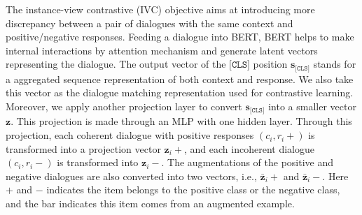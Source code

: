 \documentclass[letterpaper]{article} \usepackage{aaai22}  \usepackage{times}  \usepackage{helvet}  \usepackage{courier}  \usepackage[hyphens]{url}  \usepackage{graphicx} \urlstyle{rm} \def\UrlFont{\rm}  \usepackage{natbib}  \usepackage{caption} \DeclareCaptionStyle{ruled}{labelfont=normalfont,labelsep=colon,strut=off} \frenchspacing  \setlength{\pdfpagewidth}{8.5in}  \setlength{\pdfpageheight}{11in}  \usepackage{algorithm}
\begin{document}
The instance-view contrastive (IVC) objective aims at introducing more discrepancy between a pair of dialogues with the same context and positive/negative responses.
Feeding a dialogue into BERT, BERT helps to make internal interactions by attention mechanism and generate latent vectors representing the dialogue. The output vector of the $\texttt{[CLS]}$ position $\mathbf{s}_{\texttt{[CLS]}}$ stands for a aggregated sequence representation of both context and response. We also take this vector as the dialogue matching representation used for contrastive learning. Moreover, we apply another projection layer to convert $\mathbf{s}_{\texttt{[CLS]}}$ into a smaller vector $\mathbf{z}$. This projection is made through an MLP with one hidden layer.
Through this projection, each coherent dialogue with positive responses $(c_i, r_i+)$ is transformed into a projection vector $\mathbf{z}_i+$, and each incoherent dialogue $(c_i, r_i-)$ is transformed into $\mathbf{z}_i-$. The augmentations of the positive and negative dialogues are also converted into two vectors, i.e.,  $\mathbf{\bar{z}}_i+$ and $\mathbf{\bar{z}}_i-$. Here $+$ and $-$ indicates the item belongs to the positive class or the negative class, and the bar indicates this item comes from an augmented example. 
\end{document}
